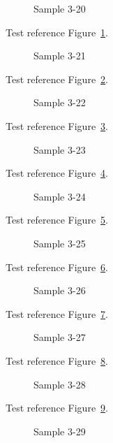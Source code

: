 \begin{figure}[tbhp]
\caption{Sample 3-20}
\label{fig:sample-3-20}
\end{figure}

Test reference Figure~\ref{fig:sample-3-20}.

\begin{figure}[tbhp]
\caption{Sample 3-21}
\label{fig:sample-3-21}
\end{figure}

Test reference Figure~\ref{fig:sample-3-21}.

\begin{figure}[tbhp]
\caption{Sample 3-22}
\label{fig:sample-3-22}
\end{figure}

Test reference Figure~\ref{fig:sample-3-22}.

\begin{figure}[tbhp]
\caption{Sample 3-23}
\label{fig:sample-3-23}
\end{figure}

Test reference Figure~\ref{fig:sample-3-23}.

\begin{figure}[tbhp]
\caption{Sample 3-24}
\label{fig:sample-3-24}
\end{figure}

Test reference Figure~\ref{fig:sample-3-24}.

\begin{figure}[tbhp]
\caption{Sample 3-25}
\label{fig:sample-3-25}
\end{figure}

Test reference Figure~\ref{fig:sample-3-25}.

\begin{figure}[tbhp]
\caption{Sample 3-26}
\label{fig:sample-3-26}
\end{figure}

Test reference Figure~\ref{fig:sample-3-26}.

\begin{figure}[tbhp]
\caption{Sample 3-27}
\label{fig:sample-3-27}
\end{figure}

Test reference Figure~\ref{fig:sample-3-27}.

\begin{figure}[tbhp]
\caption{Sample 3-28}
\label{fig:sample-3-28}
\end{figure}

Test reference Figure~\ref{fig:sample-3-28}.

\begin{figure}[tbhp]
\caption{Sample 3-29}
\label{fig:sample-3-29}
\end{figure}

